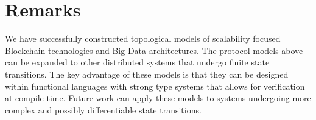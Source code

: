 \documentclass[runningheads]{llncs}
\begin{document}
\section{Remarks} 
We have successfully constructed topological models of scalability focused Blockchain technologies and Big Data architectures. The protocol models above can be expanded to other distributed systems that undergo finite state transitions. The key advantage of these models is that they can be designed within functional languages with strong type systems that allows for verification at compile time. Future work can apply these models to systems undergoing more complex and possibly differentiable state transitions.
%
%
%


%
\end{document}
